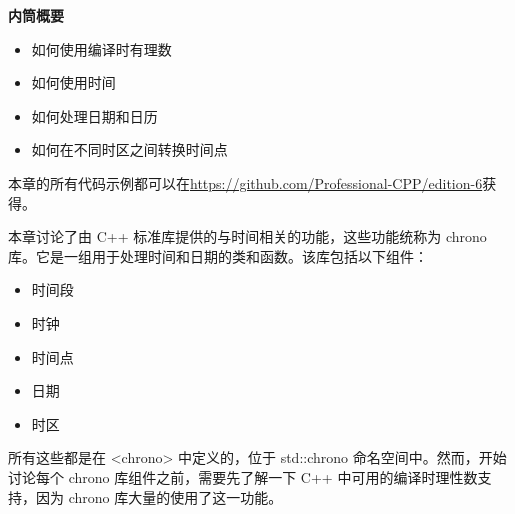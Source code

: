 \noindent
\textbf{内筒概要}

\begin{itemize}
\item
如何使用编译时有理数

\item
如何使用时间

\item
如何处理日期和日历

\item
如何在不同时区之间转换时间点
\end{itemize}

本章的所有代码示例都可以在\url{https://github.com/Professional-CPP/edition-6}获得。

本章讨论了由 C++ 标准库提供的与时间相关的功能，这些功能统称为 chrono 库。它是一组用于处理时间和日期的类和函数。该库包括以下组件：

\begin{itemize}
\item
时间段

\item
时钟

\item
时间点

\item
日期

\item
时区
\end{itemize}

所有这些都是在 <chrono> 中定义的，位于 std::chrono 命名空间中。然而，开始讨论每个 chrono 库组件之前，需要先了解一下 C++ 中可用的编译时理性数支持，因为 chrono 库大量的使用了这一功能。

